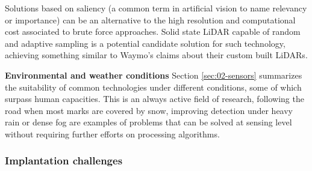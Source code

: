     Solutions based on saliency (a common term in artificial vision 
    \cite{Zhang2016a,Palazzi2018,Duthon2016} to name relevancy or importance) 
    can be an alternative to the high resolution and computational cost 
    associated to brute force approaches. Solid state LiDAR capable of
    random and adaptive sampling is a potential candidate solution for such 
    technology, achieving something similar to Waymo's claims about their custom
    built LiDARs.

\textbf{Environmental and weather conditions}    
    Section \ref{sec:02-sensors} summarizes the suitability of common 
    technologies under different conditions, some of which surpass human 
    capacities. 
    This is an always active field of research, following the road  when
    most marks are covered by snow, improving detection under heavy rain 
    or dense fog are examples of problems that can be solved at sensing
    level without requiring further efforts on processing algorithms.
        
%                
    


\subsubsection{Implantation challenges}

